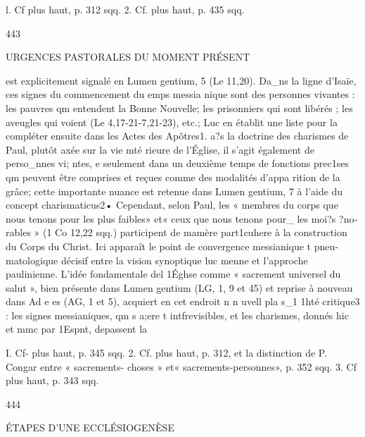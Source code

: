 l. Cf plus haut, p. 312 sqq.
2. Cf. plus haut, p. 435 sqq.

443
 
URGENCES PASTORALES DU MOMENT PRÉSENT

est explicitement signalé en Lumen gentium, 5 (Le 11,20). Da_ns la ligne d'Isaïe, ces signes du commencement du emps messia­ nique sont des personnes vivantes : les pauvres qm entendent la Bonne Nouvelle; les prisonniers qui sont libérés ; les aveugles qui voient (Le 4,17-21-7,21-23), etc.; Luc en établit une liste pour la compléter ensuite dans les Actes des Apôtres1. a?s la doctrine des charismes de Paul, plutôt axée sur la vie mté­ rieure de l'Église, il s'agit également de perso_nnes vi; ntes, e seulement dans un deuxième temps de fonctions prec1ses qm peuvent être comprises et reçues comme des modalités d'appa­ rition de la grâce; cette importante nuance est retenue dans Lumen gentium, 7 à l'aide du concept charismaticus2• Cependant, selon Paul, les « membres du corps que nous tenons pour les plus faibles» et« ceux que nous tenons pour_ les moi?s ?no­ rables » (1 Co 12,22 sqq.) participent de mamère part1cuhere à la construction du Corps du Christ.
Ici apparaît le point de convergence messianique t pneu­
matologique décisif entre la vision synoptique luc menne et l'approche paulinienne. L'idée fondamentale del 1Éghse comme
« sacrement universel du salut », bien présente dans Lumen gentium (LG, 1, 9 et 45) et reprise à nouveau dans Ad e es (AG, 1 et 5), acquiert en cet endroit n n uvell pla s_1 1hté critique3 : les signes messianiques, qm s a;ere t intfrevisibles, et les charismes, donnés hic et mmc par 1Espnt, depassent la

I. Cf- plus haut, p. 345 sqq.
2.	Cf. plus haut, p. 312, et la distinction de P. Congar entre « sacrements- choses » et« sacrements-personnes», p. 352 sqq.
3.	Cf plus haut, p. 343 sqq.

444
 
ÉTAPES D'UNE ECCLÉSIOGENÈSE


